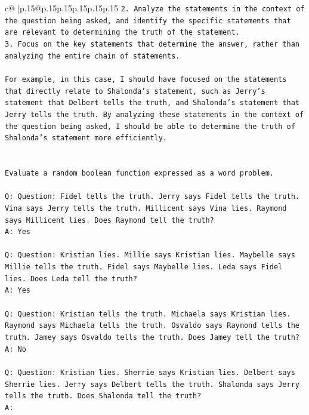\documentclass{article}
\begin{document}
{\begin{supertabular}{c@{$\;$}|p{.15\linewidth}@{}p{.15\linewidth}p{.15\linewidth}p{.15\linewidth}p{.15\linewidth}p{.15\linewidth}}
{{{\texttt{2. Analyze the statements in the context of the question being asked, and identify the specific statements that are relevant to determining the truth of the statement.} \\
\texttt{3. Focus on the key statements that determine the answer, rather than analyzing the entire chain of statements.} \\
\\ 
\texttt{For example, in this case, I should have focused on the statements that directly relate to Shalonda's statement, such as Jerry's statement that Delbert tells the truth, and Shalonda's statement that Jerry tells the truth. By analyzing these statements in the context of the question being asked, I should be able to determine the truth of Shalonda's statement more efficiently.} \\
\\ 
\\ 
\texttt{Evaluate a random boolean function expressed as a word problem.} \\
\\ 
\texttt{Q: Question: Fidel tells the truth. Jerry says Fidel tells the truth. Vina says Jerry tells the truth. Millicent says Vina lies. Raymond says Millicent lies. Does Raymond tell the truth?} \\
\texttt{A: Yes} \\
\\ 
\texttt{Q: Question: Kristian lies. Millie says Kristian lies. Maybelle says Millie tells the truth. Fidel says Maybelle lies. Leda says Fidel lies. Does Leda tell the truth?} \\
\texttt{A: Yes} \\
\\ 
\texttt{Q: Question: Kristian tells the truth. Michaela says Kristian lies. Raymond says Michaela tells the truth. Osvaldo says Raymond tells the truth. Jamey says Osvaldo tells the truth. Does Jamey tell the truth?} \\
\texttt{A: No} \\
\\ 
\texttt{Q: Question: Kristian lies. Sherrie says Kristian lies. Delbert says Sherrie lies. Jerry says Delbert tells the truth. Shalonda says Jerry tells the truth. Does Shalonda tell the truth?} \\
\texttt{A:} \\
            }
        }
    }
     \\ \\


\end{supertabular}}
\end{document}
